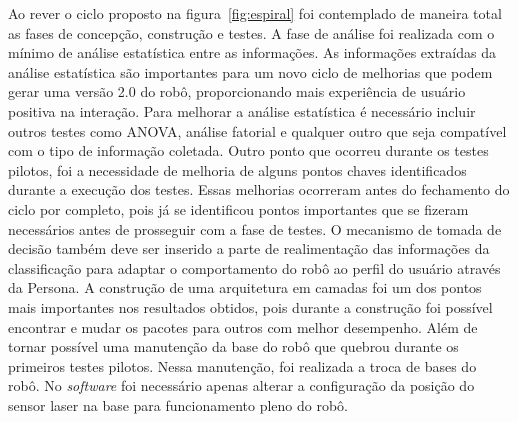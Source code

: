 Ao rever o ciclo proposto na figura~\ref{fig:espiral} foi contemplado de maneira total as fases de concepção, construção e testes. A fase de análise foi realizada com o mínimo de análise estatística entre as informações. As informações extraídas da análise estatística são importantes para um novo ciclo de melhorias que podem gerar uma versão 2.0 do robô, proporcionando mais experiência de usuário positiva na interação. Para melhorar a análise estatística é necessário incluir outros testes como ANOVA, análise fatorial e qualquer outro que seja compatível com o tipo de informação coletada. Outro ponto que ocorreu durante os testes pilotos, foi a necessidade de melhoria de alguns pontos chaves identificados durante a execução dos testes. Essas melhorias ocorreram antes do fechamento do ciclo por completo, pois já se identificou pontos importantes que se fizeram necessários antes de prosseguir com a fase de testes. O mecanismo de tomada de decisão também deve ser inserido a parte de realimentação das informações da classificação para adaptar o comportamento do robô ao perfil do usuário através da Persona. A construção de uma arquitetura em camadas foi um dos pontos mais importantes nos resultados obtidos, pois durante a construção foi possível encontrar e mudar os pacotes para outros com melhor desempenho. Além de tornar possível uma manutenção da base do robô que quebrou durante os primeiros testes pilotos. Nessa manutenção, foi realizada a troca de bases do robô. No \textit{software} foi necessário apenas alterar a configuração da posição do sensor laser na base para funcionamento pleno do robô.